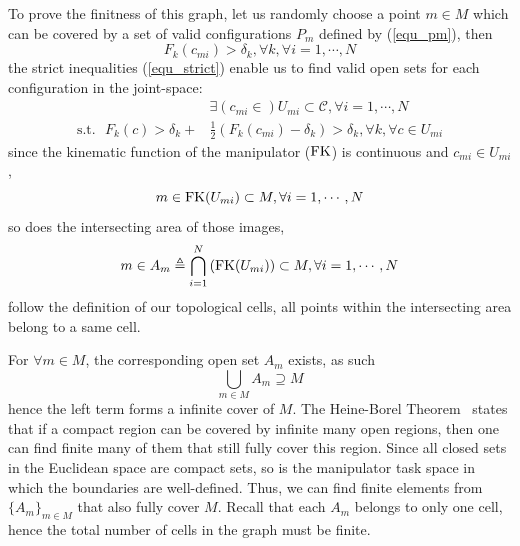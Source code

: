 \documentclass[conference]{IEEEtran}
\begin{document}
To prove the finitness of this graph, let us randomly choose a point $m\in M$ which can be covered by a set of valid 
configurations $P_m$ defined by (\ref{equ_pm}), then 
\begin{equation}
F_k(c_{mi}) > \delta_{k}, \forall k, \forall i = 1, \cdots, N
\end{equation}
the strict inequalities (\ref{equ_strict}) enable us to find valid open sets for each configuration in the joint-space:
\begin{equation}
\begin{aligned}
&\exists (c_{mi}\in )U_{mi} \subset \mathscr{C}, \forall i = 1, \cdots, N \\
\mbox{s.t.}\mbox{  } F_k(c) > \delta_k + &\frac{1}{2}(F_k(c_{mi}) - \delta_k)> \delta_k, \forall k, \forall c\in U_{mi}
\end{aligned}
\end{equation}
since the kinematic function of the manipulator (${\rm FK}$) is continuous and $c_{mi}\in U_{mi}$, 
\begin{equation}
m\in {\rm FK}(U_{mi})\subset M, \forall i = 1, \cdots, N
\end{equation}
so does the intersecting area of those images, 
\begin{equation}
m\in A_m \triangleq\bigcap\limits_{i = 1}^N\left({\rm FK} (U_{mi})\right)\subset M, \forall i = 1, \cdots, N
\end{equation}
follow the definition of our topological cells, all points within the intersecting area belong to a same cell. 

For $\forall m\in M$, the corresponding open set $A_m$ exists, as such %
\begin{equation}
\bigcup\limits_{m\in M}A_m\supseteq M
\end{equation}
hence the left term forms a infinite cover of $M$. %
The Heine-Borel Theorem~\cite{Simmons1964Introduction} states that if a compact region can be covered by infinite many open regions, then one can find finite many of them that still fully cover this region. Since all closed sets in the Euclidean space are compact sets, so is the manipulator 
task space in which the boundaries are well-defined. Thus, we can find finite elements from $\{A_m\}_{m\in M}$ that also fully 
cover $M$. Recall that each $A_m$ belongs to only one cell, hence the total number of cells in the graph must be finite.  
\end{document}
